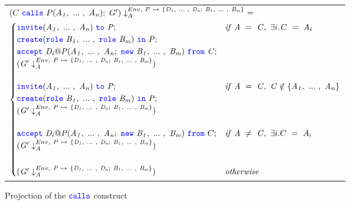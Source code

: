 \documentclass[12pt,twoside]{report}
\begin{document}
\begin{figure}[!h]
    \begin{center}
        \begin{tabular}{l}
            $(C\ \calls\ P(\roles{A}{n});\ G') \projectenv{Env,\ P\ \mapsto\ \{\roles{D}{n};\ \roles{B}{m}\}}\ =$\\[3.5pt]
            \begin{math}
                \begin{cases}
                    \invite(\roles{A}{n})\ \scrto\ \mathit{P}; & \mathit{if}\ \mathit{A}\ =\ \mathit{C},\ \exists i. \mathit{C}\ =\ \mathit{A_i}\\[0.25pt]
                    \create(\rolessig{B}{m})\ \scrin\ \mathit{P}; & \\[0.25pt]
                    \accept\ \mathit{D_i@P}(\roles{A}{n};\ \scrnew\ \roles{B}{m})\ \from\ \mathit{C}; & \\[0.25pt]
                    (\mathit{G'} \projectenv{Env,\ P\ \mapsto\ \{\roles{D}{n};\ \roles{B}{m}\}}) & \\[13pt]

                    \invite(\roles{A}{n})\ \scrto\ \mathit{P}; & \mathit{if}\ \mathit{A}\ =\ \mathit{C},\ \mathit{C} \notin \{\roles{A}{n}\} \\[0.25pt]
                    \create(\rolessig{B}{m})\ \scrin\ \mathit{P}; &\\[0.25pt]
                    (\mathit{G'} \projectenv{Env,\ P\ \mapsto\ \{\roles{D}{n};\ \roles{B}{m}\}}) &\\[13pt]

                    \accept\ \mathit{D_i@P}(\roles{A}{n};\ \scrnew\ \roles{B}{m})\ \from\ C; & \mathit{if}\ \mathit{A}\ \neq\ \mathit{C},\ \exists i. C\ =\ A_i\\[0.25pt]
                    (\mathit{G'} \projectenv{Env,\ P\ \mapsto\ \{\roles{D}{n};\ \roles{B}{m}\}}) & \\[17pt]

                    (\mathit{G'} \projectenv{Env,\ \mathit{P}\ \mapsto\ \{\roles{D}{n};\ \roles{B}{m}\}}) & \mathit{otherwise}
                \end{cases}
            \end{math}
        \end{tabular}
    \end{center}
    \caption{Projection of the ${\color{blue}\mathtt{calls}}$ construct}
    \label{scribble-calls-projection}
\end{figure}

\end{document}

